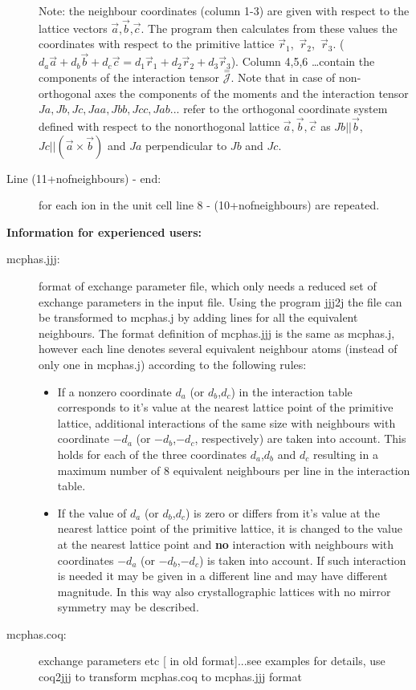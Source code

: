 \begin{description}
Note: the neighbour coordinates (column 1-3) are given with respect to the lattice vectors
$\vec a$,$\vec b$,$\vec c$. The program then calculates from these values the coordinates
with respect to the primitive lattice $\vec r_1$,~$\vec r_2$,~$\vec r_3$.
($ d_a \vec a + d_b \vec b + d_c \vec c = d_1 \vec r_1 + d_2 \vec r_2 + d_3 \vec r_3$).
Column 4,5,6 \dots contain the components of the interaction tensor $\stackrel{=}{\mathcal J}$. 
Note that in case of non-orthogonal axes the 
components of the moments and the interaction tensor $Ja, Jb, Jc, Jaa, Jbb, Jcc, Jab ...$ 
refer to the orthogonal coordinate system
defined with respect to the nonorthogonal lattice $\vec a,\vec b,\vec c$ as
$Jb||\vec b$, $Jc||(\vec a \times \vec b)$ and $Ja$ perpendicular to $Jb$ and $Jc$.
\item [Line (11+nofneighbours) - end:] for each ion in the unit cell line 8 - (10+nofneighbours)
are repeated.
\end{description}


\vspace{0.5cm}

{\small {\bf Information for experienced users:}
\begin{description}
\item[\prg mcphas.jjj:]
format of exchange parameter file, which only needs a reduced set of exchange
parameters in the input file. Using the program {\prg jjj2j} the file can be transformed
to {\prg mcphas.j} by adding lines for all the equivalent neighbours. The format definition
of {\prg mcphas.jjj} is the same as {\prg mcphas.j}, however each line denotes several
equivalent neighbour atoms (instead of only one in {\prg mcphas.j}) according to the
 following rules:
\begin{itemize}
\item If a nonzero coordinate $d_a$ (or $d_b$,$d_c$) in the interaction table
 corresponds to it's value at the nearest
 lattice point of the primitive lattice,
  additional interactions of the same size
with  neighbours with coordinate $-d_a$ (or $-d_b$,$-d_c$, respectively)
are taken into account. This
holds for each of the three coordinates $d_a$,$d_b$ and $d_c$
 resulting in a maximum
number of 8 equivalent neighbours per line in the interaction table.
\item If the value of $d_a$ (or $d_b$,$d_c$) is zero or differs
from it's value at the nearest lattice point of the primitive lattice, it is 
changed to the value at the nearest lattice point and {\bf no} interaction 
with  neighbours with coordinates $-d_a$ (or $-d_b$,$-d_c$) is
 taken into account. If such
 interaction is needed it may be given in a different line and may
have different magnitude. In this way also crystallographic lattices
with no mirror symmetry may be described.
\end{itemize}
\item[\prg mcphas.coq:]   exchange parameters etc [ in old format]...see examples for details, use {\prg coq2jjj} to 
transform {\prg mcphas.coq} to {\prg mcphas.jjj} format
\end{description}

}


